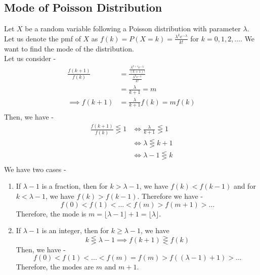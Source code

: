 \documentclass[openany]{book}
\begin{document}
\subsection{Mode of Poisson Distribution}
Let $X$ be a random variable following a Poisson distribution with parameter $\lambda$. Let us denote the pmf of $X$ as $f(k) = P(X = k) = \frac{\lambda^k e^{-\lambda}}{k!}$ for $k = 0, 1, 2, \ldots$. We want to find the mode of the distribution. \\
Let us consider -
\begin{align*}
    \frac{f(k+1)}{f(k)} &= \frac{\frac{\lambda^{k+1} e^{-\lambda}}{(k+1)!}}{\frac{\lambda^k e^{-\lambda}}{k!}} \\
    &= \frac{\lambda}{k+1} = m \\
    \implies f(k+1) &= \frac{\lambda}{k+1} f(k) = mf(k) \\
\end{align*}
Then, we have - 
\begin{align*}
    \frac{f(k+1)}{f(k)} \lesseqgtr 1 &\iff \frac{\lambda}{k+1} \lesseqgtr 1 \\
    &\iff \lambda \lesseqgtr k + 1 \\
    &\iff \lambda - 1 \lesseqgtr k \\
\end{align*}
We have two cases -
\begin{enumerate}
    \item If $\lambda - 1$ is a fraction, then for $k > \lambda - 1$, we have $f(k) < f(k-1)$ and for $k < \lambda - 1$, we have $f(k) > f(k-1)$. Therefore we have - 
    $$f(0) < f(1) < ... < f(m) > f(m+1) > ...$$
    Therefore, the mode is $m = \lfloor \lambda - 1 \rfloor + 1 = \lfloor \lambda \rfloor$.
    \item If $\lambda - 1$ is an integer, then for $k \geq \lambda - 1$, we have $$k \lesseqgtr \lambda - 1 \implies f(k+1) \gtreqless f(k)$$ 
    Then, we have - 
    $$f(0) < f(1) < ... < f(m) = f(m) > f((\lambda - 1) + 1) > ...$$
    Therefore, the modes are $m$ and $m+1$.
\end{enumerate}
\end{document}
